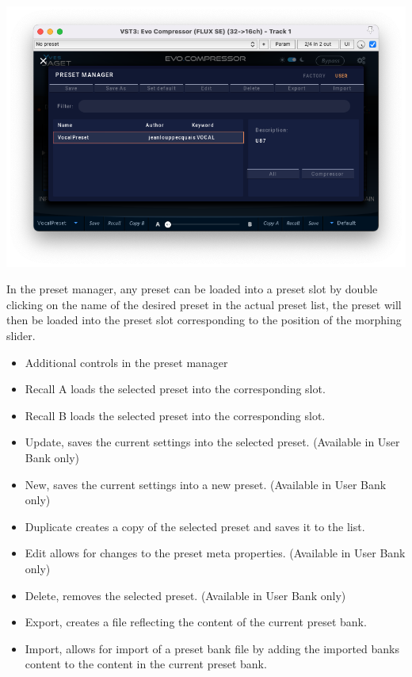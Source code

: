 \documentclass[
  letterpaper,
  DIV=11,
  numbers=noendperiod]{scrreport}
\providecommand{\tightlist}{%
  \setlength{\itemsep}{0pt}\setlength{\parskip}{0pt}}\usepackage{longtable,booktabs,array}
\begin{document}
\includegraphics{./include/evoComp_userpreset.png}

In the preset manager, any preset can be loaded into a preset slot by
double clicking on the name of the desired preset in the actual preset
list, the preset will then be loaded into the preset slot corresponding
to the position of the morphing slider.

\begin{itemize}
\tightlist
\item
  Additional controls in the preset manager
\item
  Recall A loads the selected preset into the corresponding slot.
\item
  Recall B loads the selected preset into the corresponding slot.
\item
  Update, saves the current settings into the selected preset.
  (Available in User Bank only)
\item
  New, saves the current settings into a new preset. (Available in User
  Bank only)
\item
  Duplicate creates a copy of the selected preset and saves it to the
  list.
\item
  Edit allows for changes to the preset meta properties. (Available in
  User Bank only)
\item
  Delete, removes the selected preset. (Available in User Bank only)
\item
  Export, creates a file reflecting the content of the current preset
  bank.
\item
  Import, allows for import of a preset bank file by adding the imported
  banks content to the content in the current preset bank.
\end{itemize}
\end{document}
